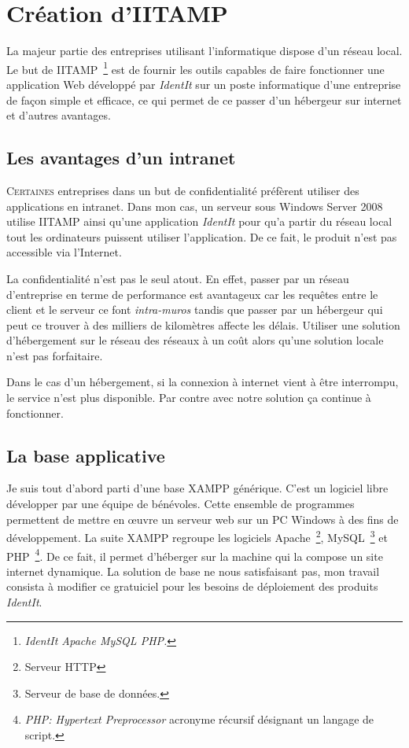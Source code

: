 \chapter{Création d'IITAMP} %
\label{cha:Création d'IITAMP}

\begin{it}
  La majeur partie des entreprises utilisant l'informatique
  dispose d'un réseau local. Le but de IITAMP\, \footnote{\emph{IdentIt
  Apache MySQL PHP.}} est de fournir les outils capables de faire
  fonctionner une application Web développé par \emph{IdentIt} sur un
  poste informatique d'une entreprise de façon simple et efficace, ce
  qui permet de ce passer d'un hébergeur sur internet et d'autres
  avantages.
\end{it}

\section{Les avantages d'un intranet} %
\label{sec:Les avantages d'un intranet}

\lettrine{C}{ertaines} entreprises dans un but de confidentialité
préfèrent utiliser des applications en intranet. Dans mon cas, un
serveur sous Windows Server 2008 utilise IITAMP ainsi
qu'une application \emph{IdentIt} pour qu'a partir du réseau local tout
les ordinateurs puissent utiliser l'application. De ce fait, le produit
n'est pas accessible via l'Internet.

La confidentialité n'est pas le seul atout. En effet, passer par un
réseau d'entreprise en terme de performance est avantageux car les
requêtes entre le client et le serveur ce font \emph{intra-muros} tandis
que passer par un hébergeur qui peut ce trouver à des milliers de
kilomètres affecte les délais. Utiliser une solution d'hébergement sur
le réseau des réseaux à un coût alors qu'une solution locale n'est pas
forfaitaire.

Dans le cas d'un hébergement, si la connexion à internet vient à être
interrompu, le service n'est plus disponible. Par contre avec notre
solution ça continue à fonctionner.

\section{La base applicative} %
\label{sec:La base applicative}

Je suis tout d'abord parti d'une base XAMPP générique. C'est un logiciel
libre développer par une équipe de bénévoles. Cette ensemble de
programmes permettent de mettre en \oe{}uvre un serveur web sur un PC
Windows à des fins de développement. La suite XAMPP regroupe les
logiciels Apache\, \footnote{Serveur HTTP}, MySQL\, \footnote{Serveur de
base de données.} et PHP\, \footnote{\emph{PHP: Hypertext Preprocessor}
acronyme récursif désignant un langage de script.}. De ce fait, il
permet d'héberger sur la machine qui la compose un site internet
dynamique. La solution de base ne nous satisfaisant pas, mon travail
consista à modifier ce gratuiciel pour les besoins de déploiement des
produits \emph{IdentIt}.

